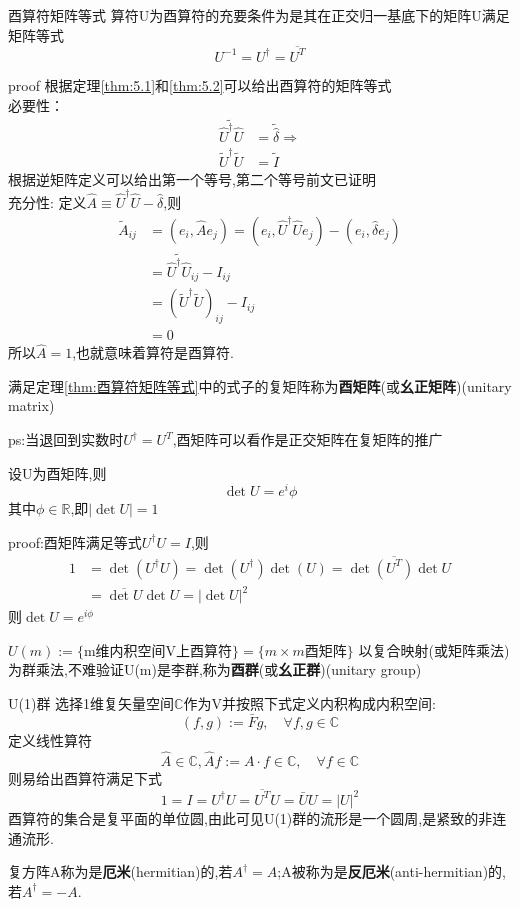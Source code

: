 \documentclass[../main.tex]{subfiles}
\begin{document}
 \begin{theorem}{}{酉算符矩阵等式}
 算符U为酉算符的充要条件为是其在正交归一基底下的矩阵U满足矩阵等式
 $$U^{-1} = U^\dagger = \overline{U^T}$$
 \end{theorem}
 proof 根据定理\ref{thm:5.1}和\ref{thm:5.2}可以给出酉算符的矩阵等式\\
 必要性：
 \begin{align*}
     \widetilde{\hat{U}^\dagger \hat{U}} &= \tilde{\hat{\delta}} \Rightarrow \\
     \tilde{U}^\dagger \tilde{U} &= \tilde{I}
 \end{align*}
 根据逆矩阵定义可以给出第一个等号,第二个等号前文已证明\\
 充分性: 定义$\hat{A}\equiv \hat{U}^\dagger\hat{U} - \hat{\delta}$,则
 \begin{align*}
 \tilde{A}_{ij}&= (e_i,\hat{A}e_j) = (e_i, \hat{U}^\dagger\hat{U}e_j) - (e_i,\hat{\delta}e_j)\\
 &=\widetilde{\hat{U}^\dagger\hat{U}}_{ij} - I_{ij}\\
 &=(\tilde{U}^\dagger\tilde{U})_{ij}- I_{ij}\\
 &= 0
 \end{align*}
 所以$\hat{A} = 1$,也就意味着算符是酉算符.
 \begin{definition}
   满足定理\ref{thm:酉算符矩阵等式}中的式子的复矩阵称为\textbf{酉矩阵}(或\textbf{幺正矩阵})(unitary matrix)  
 \end{definition}
 ps:当退回到实数时$U^\dagger = U^T$,酉矩阵可以看作是正交矩阵在复矩阵的推广

 \begin{theorem}
     设U为酉矩阵,则
     $$\det U = e^i\phi $$
     其中$\phi \in \mathbb{R}$,即$|\det U| = 1$
 \end{theorem}
 proof:酉矩阵满足等式$U^\dagger U = I$,则
 \begin{align*}
     1 &= \det(U^\dagger U) = \det(U^\dagger)\det(U) = \det\overline{(U^T)} \det U\\
         &=\overline{\det U}\det U = |\det U|^2
 \end{align*}
 则$\det U = e^{i\phi}$

 \begin{definition}
     $U(m) := \{\text{m维内积空间V上酉算符}\} = \{m\times m \text{酉矩阵}\}$
     以复合映射(或矩阵乘法)为群乘法,不难验证U(m)是李群,称为\textbf{酉群}(或\textbf{幺正群})(unitary group)
 \end{definition}
 \begin{example}{U(1)群}
 \label{ex:G-5-1}
 选择1维复矢量空间$\mathbb{C}$作为V并按照下式定义内积构成内积空间:
 $$(f,g):=\bar{F}g,\quad \forall f,g \in \mathbb{C}$$
 定义线性算符
 $$ \hat{A} \in \mathbb{C}, \hat{A}f:= A\cdot f \in \mathbb{C},\quad \forall f \in \mathbb{C}$$
 则易给出酉算符满足下式
 $$1 = I = U^\dagger U = \overline{U^T}U = \bar{U}{U} = |U|^2$$
 酉算符的集合是复平面的单位圆,由此可见U(1)群的流形是一个圆周,是紧致的非连通流形.
 \end{example}
 \begin{definition}
     复方阵A称为是\textbf{厄米}(hermitian)的,若$A^\dagger = A$;A被称为是\textbf{反厄米}(anti-hermitian)的,若$A^\dagger = -A$.
 \end{definition}
\end{document}
